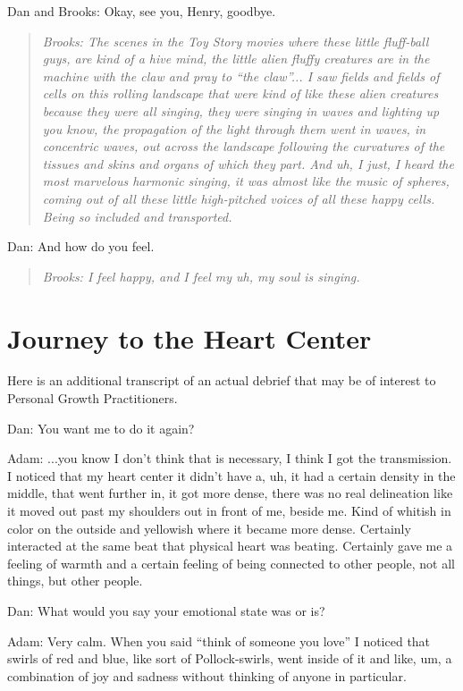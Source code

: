 \documentclass[12pt]{book}
\begin{document}
Dan and Brooks: Okay,  see you, Henry, goodbye.


\begin{quote}{\em
Brooks:  The scenes in the Toy Story movies where these
little fluff-ball guys, are kind of a hive mind,
the little alien fluffy creatures are in the machine
with the claw and pray to ``the claw''...
I saw fields and fields of cells on this rolling landscape
that were kind of like these alien creatures because they
were all singing, they were singing in waves and lighting up
you know, the propagation of the light through them went
in waves, in concentric waves, out across the landscape
following the curvatures of the tissues and skins and organs
of which they part. And uh, I just,  I heard the most marvelous harmonic
singing, it was almost like the music of spheres,
coming out of all these little high-pitched voices 
of all these happy cells.
Being so included and transported.
}\end{quote}

Dan: And how do you feel.

\begin{quote}{\em
Brooks: I feel happy, and I feel my uh, my soul is singing.
}\end{quote}    

\section{Journey to the Heart Center}

Here is an additional transcript of an actual debrief that may be of interest to Personal Growth Practitioners.

\hrulefill

Dan: You want me to do it again?

Adam: ...you know I don’t think that is necessary, I think I got the transmission. I noticed that my heart center it didn't have a, uh, it had a certain density in the middle, that went further in, it got more dense, there was no real delineation like it moved out past my shoulders out in front of me, beside me. Kind of whitish in color on the outside and yellowish where it became more dense. Certainly interacted at the same beat that physical heart was beating. Certainly gave me a feeling of warmth and a certain feeling of being connected to other people, not all things, but other people.
					
Dan: What would you say your emotional state was or is?
					
Adam: Very calm. When you said ``think of someone you love'' I noticed that swirls of red and blue, like sort of Pollock-swirls, went inside of it and like, um, a combination of joy and sadness without thinking of anyone in particular.
					
\end{document}
